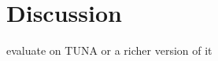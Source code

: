 \section{Discussion} \label{sec:discussion}

evaluate on TUNA \cite{deemter06:_build_seman_trans_corpus_for} or a
richer version of it

